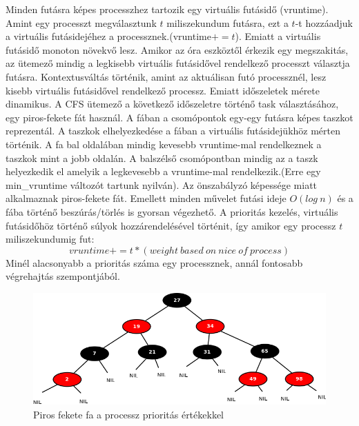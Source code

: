 Minden futásra képes processzhez tartozik egy virtuális futásidő (vruntime). Amint egy processzt megválasztunk $t$ miliszekundum futásra, ezt a $t$-t hozzáadjuk a virtuális futásidejéhez a processznek.(vruntime$+=t$). Emiatt a virtuális futásidő monoton növekvő lesz.
Amikor az óra eszköztől érkezik egy megszakitás, az ütemező mindig a legkisebb virtuális futásidővel rendelkező processzt választja futásra. Kontextusváltás történik, amint az aktuálisan futó processznél, lesz kisebb virtuális futásidővel rendelkező processz. Emiatt időszeletek mérete dinamikus. 
A CFS ütemező a következő időszeletre történő task választásához, egy piros-fekete fát használ. A fában a csomópontok egy-egy futásra képes taszkot reprezentál. A taszkok elhelyezkedése a fában a virtuális futásidejükhöz mérten történik. A fa bal oldalában mindig kevesebb vruntime-mal rendelkeznek a taszkok mint a jobb oldalán. A balszélső csomópontban mindig az a taszk helyezkedik el amelyik a legkevesebb a vruntime-mal rendelkezik.(Erre egy min\_vruntime változót tartunk nyilván). Az önszabályzó képessége miatt alkalmaznak piros-fekete fát. Emellett minden művelet futási ideje $O(log\ n)$ és a fába történő beszúrás/törlés is gyorsan végezhető.
A prioritás kezelés, virtuális futásidőhöz történő súlyok hozzárendelésével történit, így amikor egy processz $t$ miliszekundumig fut:
$$vruntime+=t*(weight\ based\ on\ nice\ of\ process)$$
Minél alacsonyabb a prioritás száma egy processznek, annál fontosabb végrehajtás szempontjából.
\begin{figure}[h]
\centering
\includegraphics[width=\textwidth]{images/rb_tree.png}
\caption{Piros fekete fa a processz prioritás értékekkel}
\label{fig:rb_tree}
\end{figure}
